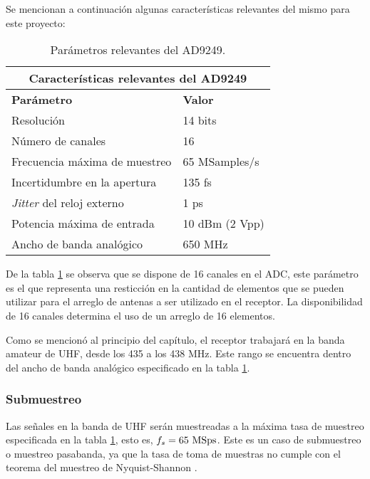 \documentclass[../../main.tex]{subfiles}
\begin{document}
Se mencionan a continuación algunas características relevantes del mismo para este proyecto:
\begin{table}[H]
    \centering
    \begin{tabular}{|ll|}
    \hline
    \multicolumn{2}{|c|}{\textbf{Características relevantes del AD9249}}                      \\ \hline
    \multicolumn{1}{|l|}{\textbf{Parámetro}}                                          & \textbf{Valor}          \\ \hline
    \multicolumn{1}{|l|}{Resolución}                                         & 14 bits        \\ \hline
    \multicolumn{1}{|l|}{Número de canales}                                  & 16             \\ \hline
    \multicolumn{1}{|l|}{Frecuencia máxima de muestreo}                      & 65 MSamples/s  \\ \hline
    \multicolumn{1}{|l|}{Incertidumbre en la apertura}                       & 135 fs         \\ \hline
    \multicolumn{1}{|l|}{\textit{Jitter} del reloj externo} & 1 ps           \\ \hline
    \multicolumn{1}{|l|}{Potencia máxima de entrada}                         & 10 dBm (2 Vpp) \\ \hline
    \multicolumn{1}{|l|}{Ancho de banda analógico}                           & 650 MHz        \\ \hline
    \end{tabular}
    \caption{Parámetros relevantes del AD9249.}
    \label{tab::ADC}
\end{table}

De la tabla \ref{tab::ADC} se observa que se dispone de 16 canales en el ADC, este parámetro es el que representa una resticción en la cantidad de elementos que se pueden utilizar para el arreglo de antenas a ser utilizado en el receptor. La disponibilidad de 16 canales determina el uso de un arreglo de 16 elementos.

Como se mencionó al principio del capítulo, el receptor trabajará en la banda amateur de UHF, desde los 435 a los 438 MHz. Este rango se encuentra dentro del ancho de banda analógico especificado en la tabla \ref{tab::ADC}.


\subsubsection{Submuestreo}
Las señales en la banda de UHF serán muestreadas a la máxima tasa de muestreo especificada en la tabla \ref{tab::ADC}, esto es, $f_s = 65~\textrm{MSps}$. Este es un caso de submuestreo o muestreo pasabanda, ya que la tasa de toma de muestras no cumple con el teorema del muestreo de Nyquist-Shannon \cite{teorema-del-muestreo}.
\end{document}
